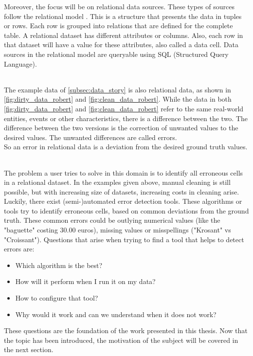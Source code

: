 Moreover, the focus will be on relational data sources. These types of sources follow the relational model \cite{Codd1970-vj}. This is a structure that presents the data in tuples or rows. Each row is grouped into relations that are defined for the complete table. A relational dataset has different attributes or columns. Also, each row in that dataset will have a value for these attributes, also called a data cell. Data sources in the relational model are queryable using SQL (Structured Query Language). 

~\\The example data of \autoref{subsec:data_story} is also relational data, as shown in \autoref{fig:dirty_data_robert} and \autoref{fig:clean_data_robert}. While the data in both \autoref{fig:dirty_data_robert} and \autoref{fig:clean_data_robert} refer to the same real-world entities, events or other characteristics, there is a difference between the two. The difference between the two versions is the correction of unwanted values to the desired values. The unwanted differences are called errors.
~\\So an error in relational data is a deviation from the desired ground truth values.

~\\The problem a user tries to solve in this domain is to identify all erroneous cells in a relational dataset. In the examples given above, manual cleaning is still possible, but with increasing size of datasets, increasing costs in cleaning arise. Luckily, there exist (semi-)automated error detection tools. These algorithms or tools try to identify erroneous cells, based on common deviations from the ground truth. These common errors could be outlying numerical values (like the "baguette" costing 30.00 euros), missing values or misspellings ("Krosant" vs "Croissant"). Questions that arise when trying to find a tool that helps to detect errors are:

\begin{itemize}
    \item Which algorithm is the best?
    \item How will it perform when I run it on my data?
    \item How to configure that tool?
    \item Why would it work and can we understand when it does not work?
\end{itemize}

These questions are the foundation of the work presented in this thesis. Now that the topic has been introduced, the motivation of the subject will be covered in the next section.